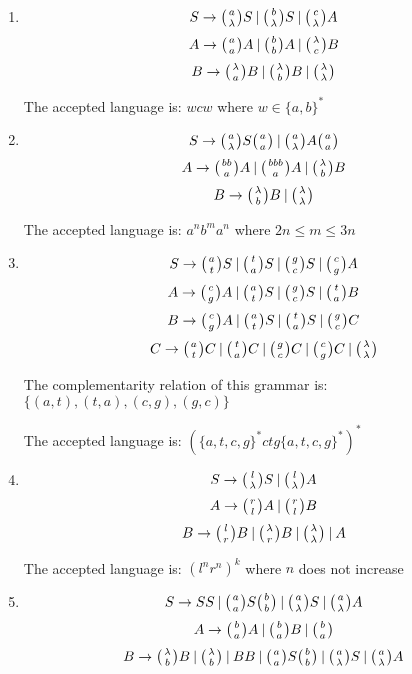 \begin{enumerate}
{    The accepted language is: $a^nb^mc^nd^m$ where $n, m \geq 1$
  }

  \item{
    $$S \rightarrow \wkpair{a}{\lambda} S \:|\: \wkpair{b}{\lambda} S \:|\: \wkpair{c}{\lambda} A$$
    $$A \rightarrow \wkpair{a}{a} A \:|\: \wkpair{b}{b} A \:|\: \wkpair{\lambda}{c} B$$
    $$B \rightarrow \wkpair{\lambda}{a} B \:|\: \wkpair{\lambda}{b} B \:|\: \wkpair{\lambda}{\lambda}$$

    The accepted language is: $wcw$ where $w \in \{a, b\}^*$
  }

  \item{
    $$S \rightarrow \wkpair{a}{\lambda} S \wkpair{a}{a} \:|\: \wkpair{a}{\lambda} A \wkpair{a}{a} $$
    $$A \rightarrow \wkpair{bb}{a} A \:|\: \wkpair{bbb}{a} A \:|\: \wkpair{\lambda}{b} B$$
    $$B \rightarrow \wkpair{\lambda}{b} B \:|\: \wkpair{\lambda}{\lambda}$$

    The accepted language is: $a^nb^ma^n$ where $2n \leq m \leq 3n$
  }

  \item{
    $$S \rightarrow \wkpair{a}{t} S \:|\: \wkpair{t}{a} S \:|\: \wkpair{g}{c} S \:|\: \wkpair{c}{g} A$$
    $$A \rightarrow \wkpair{c}{g} A \:|\: \wkpair{a}{t} S \:|\: \wkpair{g}{c} S \:|\: \wkpair{t}{a} B$$
    $$B \rightarrow \wkpair{c}{g} A \:|\: \wkpair{a}{t} S \:|\: \wkpair{t}{a} S \:|\: \wkpair{g}{c} C$$
    $$C \rightarrow \wkpair{a}{t} C \:|\: \wkpair{t}{a} C \:|\: \wkpair{g}{c} C \:|\: \wkpair{c}{g} C \:|\: \wkpair{\lambda}{\lambda}$$

    The complementarity relation of this grammar is: $\{(a, t), (t, a), (c, g), (g, c)\}$

    The accepted language is: $(\{a,t,c,g\}^*ctg\{a,t,c,g\}^*)^*$
  }

  \item{
    $$S \rightarrow \wkpair{l}{\lambda} S \:|\: \wkpair{l}{\lambda} A$$
    $$A \rightarrow \wkpair{r}{l} A \:|\: \wkpair{r}{l} B$$
    $$B \rightarrow \wkpair{l}{r} B \:|\: \wkpair{\lambda}{r} B \:|\: \wkpair{\lambda}{\lambda} \:|\: A$$

    The accepted language is: $(l^n r^n)^k$ where $n$ does not increase 
  }

  \item{
    $$S \rightarrow S S \:|\: \wkpair{a}{a} S \wkpair{b}{b} \:|\: \wkpair{a}{\lambda} S \:|\: \wkpair{a}{\lambda} A$$
    $$A \rightarrow \wkpair{b}{a} A \:|\: \wkpair{b}{a} B \:|\: \wkpair{b}{a}$$
    $$B \rightarrow \wkpair{\lambda}{b} B \:|\: \wkpair{\lambda}{b} \:|\: B B \:|\: \wkpair{a}{a} S \wkpair{b}{b} \:|\: \wkpair{a}{\lambda} S \:|\: \wkpair{a}{\lambda} A$$

}
\end{enumerate}
